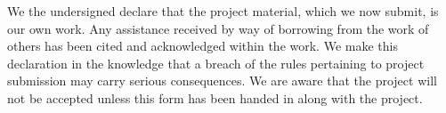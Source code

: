 We the undersigned declare that the project material, which we now submit, is our own work. Any assistance received by way of borrowing from the work of others has been cited and acknowledged within the work. We make this declaration in the knowledge that a breach of the rules pertaining to project submission may carry serious consequences. We are aware that the project will not be accepted unless this form has been handed in along with the project. 
